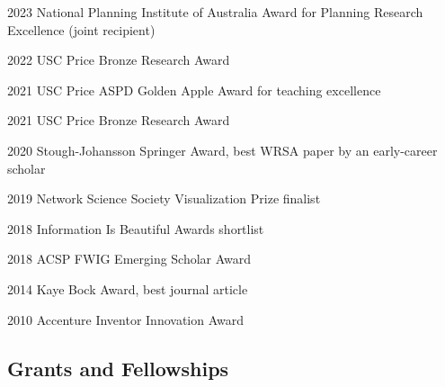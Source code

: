 \documentclass[11pt,letterpaper]{report}
\begin{document}
    \begin{tablist}

        \item[2023] \tab{}National Planning Institute of Australia Award for Planning Research Excellence (joint recipient)
        \item[2022] \tab{}USC Price Bronze Research Award
        \item[2021] \tab{}USC Price ASPD Golden Apple Award for teaching excellence
        \item[2021] \tab{}USC Price Bronze Research Award
        \item[2020] \tab{}Stough-Johansson Springer Award, best WRSA paper by an early-career scholar
        \item[2019] \tab{}Network Science Society Visualization Prize finalist
        \item[2018] \tab{}Information Is Beautiful Awards shortlist
        \item[2018] \tab{}ACSP FWIG Emerging Scholar Award
        \item[2014] \tab{}Kaye Bock Award, best journal article
        \item[2010] \tab{}Accenture Inventor Innovation Award

    \end{tablist}

    \subsection*{Grants and Fellowships}
\end{document}
